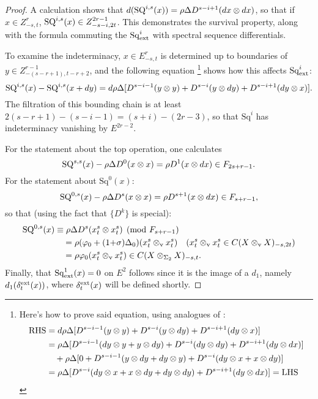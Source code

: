 \documentclass[11pt]{amsart}
\theoremstyle{plain}
\theoremstyle{definition}
\let\phi\varphi
\newcommand{\twist}{\sigma}
\theoremstyle{plain}
\newcommand{\Sq}{\mathrm{Sq}}
\begin{document}
\begin{proof}
A calculation shows that $d(\textup{SQ}^{i,s}(x))=\rho\Delta D^{s-i+1}(dx\otimes dx)$, so that if $x\in Z^r_{-s,t}$, $\textup{SQ}^{i,s}(x)\in Z^{2r-1}_{-s-i,2t}$. This demonstrates the survival property, along with the formula commuting the $\Sq^i_\textup{ext}$ with spectral sequence differentials.

To examine the indeterminacy, $x\in E^r_{-s,t}$ is determined up to boundaries of $y\in Z^{r-1}_{-(s-r+1),t-r+2}$, and the following equation%
\footnote{Here's how to prove said equation, using analogues of \cite[(1.111),(1.112)]{MR2245560}:
\begin{alignat*}{2}
\textup{RHS}
&=
d\rho\Delta [D^{s-i-1}(y\otimes y)+D^{s-i}(y\otimes dy)+D^{s-i+1}(dy\otimes x)]%
\\
&=
\rho\Delta [D^{s-i-1}(dy\otimes y+y\otimes dy)+D^{s-i}(dy\otimes dy)+D^{s-i+1}(dy\otimes dx)]%
\\
&\ \ \ +
\rho\Delta [0+D^{s-i-1}(y\otimes dy+dy\otimes y)+D^{s-i}(dy\otimes x+x\otimes dy)]%
\\
&=
\rho\Delta [D^{s-i}(dy\otimes x+x\otimes dy+dy\otimes dy)
+D^{s-i+1}(dy\otimes dx)]=\textup{LHS}%
\end{alignat*}} shows how this affects $\Sq^{i}_\textup{ext}$:
\[\textup{SQ}^{i,s}(x)-\textup{SQ}^{i,s}(x+dy)=d\rho\Delta [D^{s-i-1}(y\otimes y)+D^{s-i}(y\otimes dy)+D^{s-i+1}(dy\otimes x)].\]
The filtration of this bounding chain is at least $2(s-r+1)-(s-i-1)=(s+i)-(2r-3)$, so that $\Sq^i$ has indeterminacy vanishing by $E^{2r-2}$.

For the statement about the top operation, one calculates
\[\textup{SQ}^{s,s}(x)-\rho\Delta D^0(x\otimes x)=\rho D^{1}(x\otimes dx)\in F_{2s+r-1}.\]
For the statement about $\Sq^0(x)$:
\[\textup{SQ}^{0,s}(x)-\rho\Delta D^s(x\otimes x)=\rho D^{s+1}(x\otimes dx)\in F_{s+r-1},\]
so that (using the fact that $\{D^k\}$ is special):
\begin{alignat*}{2}
\textup{SQ}^{0,s}(x)
&\equiv
\rho\Delta D^s(x^s_t\otimes x^s_t)\pmod{F_{s+r-1}}%
\\
&\quad =
\rho(\phi_0+(1{+}\twist)\Delta_0)(x^s_t\otimes_\textup{v} x^s_t)%
\quad\text{($x^s_t\otimes_\textup{v} x^s_t\in C(X\otimes_\textup{v}X)_{-s,2t}$)}\\
&\quad =
\rho\phi_0(x^s_t\otimes_\textup{v} x^s_t)\in C(X\otimes_{\Sigma_2} X)_{-s,t}.
\end{alignat*}
Finally, that $\Sq^1_\textup{ext}(x)=0$ on $E^2$ follows since it is the image of a $d_1$, namely $d_1(\delta_t^\textup{ext}(x))$, where $\delta_t^\textup{ext}(x)$ will be defined shortly.
\end{proof}
\end{document}
